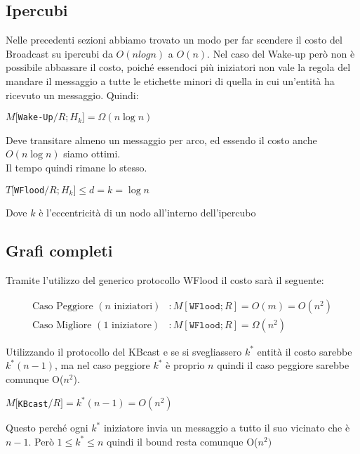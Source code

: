 \subsection{Ipercubi}
Nelle precedenti sezioni abbiamo trovato un modo per far scendere il costo del
Broadcast su ipercubi da $O(nlogn)$ a $O(n)$. Nel caso del Wake-up però non è
possibile abbassare il costo, poiché essendoci più iniziatori non vale la regola
del mandare il messaggio a tutte le etichette minori di quella in cui un'entità
ha ricevuto un messaggio. Quindi:
\begin{center}
    $M[$\texttt{Wake-Up}$/R;H_k] = \Omega(n \log n)$ \\
\end{center}
Deve transitare almeno un messaggio per arco, ed essendo il costo anche $O(n
    \log n)$ siamo ottimi.\\
Il tempo quindi rimane lo stesso.
\begin{center}
    $T[$\texttt{WFlood}$/R;H_k] \leq d = k = \log n$ \\
\end{center}
Dove $k$ è l'eccentricità di un nodo all'interno dell'ipercubo

\subsection{Grafi completi}
Tramite l'utilizzo del generico protocollo WFlood il costo sarà il seguente:

\begin{equation*}
    \begin{split}
        \text{Caso Peggiore } (n \text{ iniziatori})&: M\left[\texttt{WFlood};R\right] = O(m) = O(n^2) \\
        \text{Caso Migliore } (1 \text{ iniziatore})&: M\left[\texttt{WFlood};R\right] = \Omega(n^2)
    \end{split}
\end{equation*}

Utilizzando il protocollo del KBcast e se si svegliassero $k^*$ entità il costo
sarebbe $k^*(n-1)$, ma nel caso peggiore $k^*$ è proprio $n$ quindi il caso
peggiore sarebbe comunque O($n^2$).
\begin{center}
    $M[$\texttt{KBcast}$/R] = k^*(n-1) = O(n^2)$
\end{center}
Questo perché ogni $k^*$ iniziatore invia un messaggio a tutto il suo vicinato
che è $n-1$. Però $1\leq k^* \leq n$ quindi il bound resta comunque O($n^2)$

